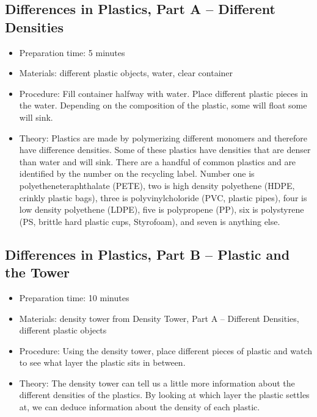\subsection{Differences in Plastics, Part A -- Different Densities}
\begin{itemize}
\item{Preparation time: 5 minutes}
\item{Materials: different plastic objects, water, clear container}
\item{Procedure: Fill container halfway with water. Place different plastic pieces in the water. Depending on the composition of the plastic, some will float some will sink. }
\item{Theory: Plastics are made by polymerizing different monomers and therefore have difference densities. Some of these plastics have densities that are denser than water and will sink. There are a handful of common plastics and are identified by the number on the recycling label. Number one is polyetheneteraphthalate (PETE), two is high density polyethene (HDPE, crinkly plastic bags), three is polyvinylcholoride (PVC, plastic pipes), four is low density polyethene (LDPE), five is polypropene (PP), six is polystyrene (PS, brittle hard plastic cups, Styrofoam), and seven is anything else. }
\end{itemize}

\subsection{Differences in Plastics, Part B -- Plastic and the Tower}
\begin{itemize}
\item{Preparation time: 10 minutes}
\item{Materials: density tower from Density Tower, Part A -- Different Densities, different plastic objects}
\item{Procedure: Using the density tower, place different pieces of plastic and watch to see what layer the plastic sits in between.}
\item{Theory: The density tower can tell us a little more information about the different densities of the plastics. By looking at which layer the plastic settles at, we can deduce information about the density of each plastic.}
\end{itemize}

